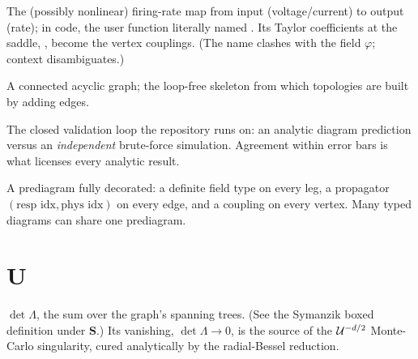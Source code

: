\begin{description}[leftmargin=0pt,style=nextline]
  \item[Transfer function ($\varphi$)] The (possibly nonlinear) firing-rate map from
        input (voltage/current) to output (rate); in code, the user function literally
        named . Its Taylor coefficients at the saddle,
        , become the vertex couplings. (The name clashes
        with the field $\varphi$; context disambiguates.)

  \item[Tree] A connected acyclic graph; the loop-free skeleton from which
        topologies are built by adding edges.

  \item[Trust chain] The closed validation loop the repository runs on: an analytic
        diagram prediction versus an \emph{independent} brute-force simulation.
        Agreement within error bars is what licenses every analytic result.

  \item[Typed diagram (\code{TypedDiagram})] A prediagram fully decorated: a definite
        field type on every leg, a propagator $(\text{resp idx},\text{phys idx})$ on
        every edge, and a coupling on every vertex. Many typed diagrams can share one
        prediagram.

\end{description}

\section*{U}
\begin{description}[leftmargin=0pt,style=nextline]

  \item[$\Usym$ (first Symanzik polynomial)] $\det\Lambda$, the sum over the graph's
        spanning trees. (See the Symanzik boxed definition under \textbf{S}.) Its
        vanishing, $\det\Lambda\to 0$, is the source of the $\mathcal{U}^{-d/2}$
        Monte-Carlo singularity, cured analytically by the radial-Bessel reduction.

\end{description}

